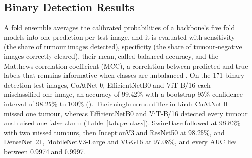 \documentclass[a4paper,fleqn]{cas-sc}
\begin{document}
\subsection{Binary Detection Results}
\label{sec:binary-results}

A fold ensemble averages the calibrated probabilities of a backbone's five fold models into one prediction per test image, and it is evaluated with sensitivity (the share of tumour images detected), specificity (the share of tumour-negative images correctly cleared), their mean, called balanced accuracy, and the Matthews correlation coefficient (MCC), a correlation between predicted and true labels that remains informative when classes are imbalanced \citep{matthews1975,chicco2020}. On the 171 binary detection test images, CoAtNet-0, EfficientNetB0 and ViT-B/16 each misclassified one image, an accuracy of 99.42\% with a bootstrap 95\% confidence interval of 98.25\% to 100\% (). Their single errors differ in kind: CoAtNet-0 missed one tumour, whereas EfficientNetB0 and ViT-B/16 detected every tumour and raised one false alarm (Table~\ref{tab:perclass}). Swin-Base followed at 98.83\% with two missed tumours, then InceptionV3 and ResNet50 at 98.25\%, and DenseNet121, MobileNetV3-Large and VGG16 at 97.08\%, and every AUC lies between 0.9974 and 0.9997.
\end{document}
